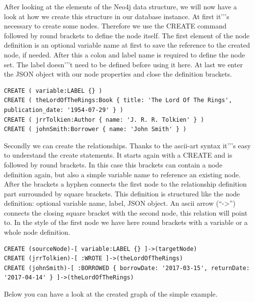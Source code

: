 After looking at the elements of the Neo4j data structure, we will now have a look at how we create this structure in our database instance.
At first it'’'s necessary to create some nodes. Therefore we use the CREATE command followed by round brackets to define the node itself. The first element of the node definition is an optional variable name at first to save the reference to the created node, if needed. After this a colon and label name is required to define the node set. The label doesn'’'t need to be defined before using it here. At last we enter the JSON object with our node properties and close the definition brackets.
\cite["Create a Record for Yourself", para. 1]{NeoTechnologyInc.2017d} \cite[p. 80]{Gupta.2015}

\begin{lstlisting}[frame=single, caption=Create Database, label=creategraphdb]
CREATE ( variable:LABEL {} )
CREATE ( theLordOfTheRings:Book { title: 'The Lord Of The Rings', publication_date: '1954-07-29' } )
CREATE ( jrrTolkien:Author { name: 'J. R. R. Tolkien' } )
CREATE ( johnSmith:Borrower { name: 'John Smith' } )
\end{lstlisting}

Secondly we can create the relationships. Thanks to the ascii-art syntax it'’'s easy to understand the create statements. It starts again with a CREATE and is followed by round brackets. In this case this brackets can contain a node definition again, but also a simple variable name to reference an existing node. After the brackets a hyphen connects the first node to the relationship definition part surrounded by square brackets. This definition is structured like the node definition: optional variable name, label, JSON object. An ascii arrow (“->”) connects the closing square bracket with the second node, this relation will point to. In the style of the first node we have here round brackets with a variable or a  whole node definition.
\cite["Create a Record for Yourself", para. 1]{NeoTechnologyInc.2017d} \cite[p. 81-82]{Gupta.2015}

\begin{lstlisting}[frame=single, caption=Create Relationships, label=creategraphrelationships]
CREATE (sourceNode)-[ variable:LABEL {} ]->(targetNode)
CREATE (jrrTolkien)-[ :WROTE ]->(theLordOfTheRings)
CREATE (johnSmith)-[ :BORROWED { borrowDate: '2017-03-15', returnDate: '2017-04-14' } ]->(theLordOfTheRings)
\end{lstlisting}

Below you can have a look at the created graph of the simple example.

